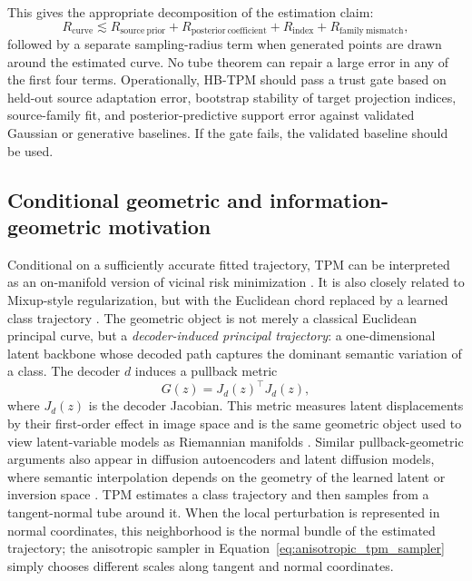 \documentclass{article}
\begin{document}
This gives the appropriate decomposition of the estimation claim:
\begin{equation}
	R_{\mathrm{curve}}
	\lesssim
	R_{\mathrm{source\ prior}}
	+R_{\mathrm{posterior\ coefficient}}
	+R_{\mathrm{index}}
	+R_{\mathrm{family\ mismatch}},
	\label{eq:hb_risk_decomposition}
\end{equation}
followed by a separate sampling-radius term when generated points are drawn around the estimated curve. No tube theorem can repair a large error in any of the first four terms. Operationally, HB-TPM should pass a trust gate based on held-out source adaptation error, bootstrap stability of target projection indices, source-family fit, and posterior-predictive support error against validated Gaussian or generative baselines. If the gate fails, the validated baseline should be used.

\subsection{Conditional geometric and information-geometric motivation}
Conditional on a sufficiently accurate fitted trajectory, TPM can be interpreted as an on-manifold version of vicinal risk minimization \citep{chapelle2000vicinal, vapnik1998statistical}. It is also closely related to Mixup-style regularization, but with the Euclidean chord replaced by a learned class trajectory \citep{zhang2018mixup, verma2019manifoldmixup}. The geometric object is not merely a classical Euclidean principal curve, but a \emph{decoder-induced principal trajectory}: a one-dimensional latent backbone whose decoded path captures the dominant semantic variation of a class. The decoder $d$ induces a pullback metric
\[
	G(z)=J_d(z)^\top J_d(z),
\]
where $J_d(z)$ is the decoder Jacobian. This metric measures latent displacements by their first-order effect in image space and is the same geometric object used to view latent-variable models as Riemannian manifolds \citep{amari1998natural, hauberg2015principal, arvanitidis2018latent, shao2018riemannian}. Similar pullback-geometric arguments also appear in diffusion autoencoders and latent diffusion models, where semantic interpolation depends on the geometry of the learned latent or inversion space \citep{preechakul2022diffusion, rombach2022high}. TPM estimates a class trajectory and then samples from a tangent-normal tube around it. When the local perturbation is represented in normal coordinates, this neighborhood is the normal bundle of the estimated trajectory; the anisotropic sampler in Equation~\ref{eq:anisotropic_tpm_sampler} simply chooses different scales along tangent and normal coordinates.
\end{document}
